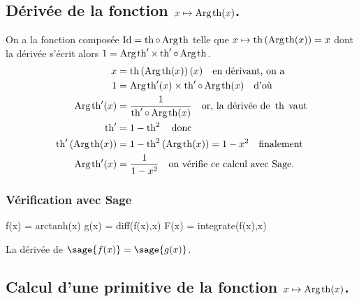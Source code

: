 \documentclass[a4paper,12pt]{report}
\def\Id{\ensuremath{\mathrm{Id}}}
\renewcommand{\tanh}{\mathop{\mathrm{th}}}
\renewcommand{\arg}{\mathop{\mathrm{Arg}}}
\begin{document}
\subsection{Dérivée de la fonction $x \mapsto \arg\mspace{-1mu}\tanh(x)$.}
On a la fonction composée $\Id = \tanh \circ \arg\mspace{-1mu}\tanh$ telle que $x\mapsto\tanh\left(\arg\mspace{-1mu}\tanh(x)\right)=x$ dont la dérivée s'écrit alors $1= \arg\mspace{-1mu}\tanh\nolimits' \times \tanh\nolimits'\circ\arg\mspace{-1mu}\tanh$.
\begin{align*}
x & =\tanh\left(\arg\mspace{-1mu}\tanh(x)\right)(x) \quad \textrm{en dérivant, on a}\\
1 & = \arg\mspace{-1mu}\tanh\nolimits'(x) \times \tanh\nolimits'\circ\arg\mspace{-1mu}\tanh(x) \quad \textrm{d'où}\\
\arg\mspace{-1mu}\tanh\nolimits'(x) & =\frac{1}{ \tanh\nolimits'\circ\arg\mspace{-1mu}\tanh(x)}\quad \textrm{or, la dérivée de } \tanh \; \textrm{vaut}\\
\tanh\nolimits' & = 1-\tanh\nolimits^2 \quad \textrm{donc} \\
\tanh\nolimits'\left(\arg\mspace{-1mu}\tanh(x)\right) & = 1 - \tanh\nolimits^2 \left(\arg\mspace{-1mu}\tanh(x)\right) = 1 - x^2 \quad \textrm{finalement}\\
\arg\mspace{-1mu}\tanh\nolimits'(x) & = \frac{1}{ 1- x^2} \quad \textrm{on vérifie ce calcul avec Sage.}
\end{align*}


\subsubsection{Vérification avec Sage}


\begin{sageblock}
    f(x) = arctanh(x)
    g(x) = diff(f(x),x)
    F(x) = integrate(f(x),x)
\end{sageblock}

La dérivée de $\sage{f(x)} = \sage{g(x)} $.


\subsection{Calcul d'une primitive de la fonction  $x \mapsto \arg\mspace{-1mu}\tanh(x)$.}
\end{document}
